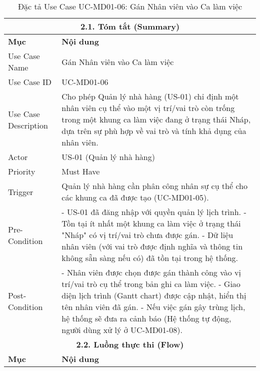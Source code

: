 \begin{longtable}{|m{4cm}|p{11cm}|}
\caption{Đặc tả Use Case UC-MD01-06: Gán Nhân viên vào Ca làm việc} \label{tab:uc_md01_06_revised} \\
\hline
\multicolumn{2}{|c|}{\textbf{2.1. Tóm tắt (Summary)}} \\
\hline
\textbf{Mục} & \textbf{Nội dung} \\
\hline
\endhead %
\hline
\endfoot %
\hline
\endlastfoot %
Use Case Name & Gán Nhân viên vào Ca làm việc \\
\hline
Use Case ID & UC-MD01-06 \\
\hline
Use Case Description & Cho phép Quản lý nhà hàng (US-01) chỉ định một nhân viên cụ thể vào một vị trí/vai trò còn trống trong một khung ca làm việc đang ở trạng thái Nháp, dựa trên sự phù hợp về vai trò và tính khả dụng của nhân viên. \\
\hline
Actor & US-01 (Quản lý nhà hàng) \\
\hline
Priority & Must Have \\
\hline
Trigger & Quản lý nhà hàng cần phân công nhân sự cụ thể cho các khung ca đã được tạo (UC-MD01-05). \\
\hline
Pre-Condition & - US-01 đã đăng nhập với quyền quản lý lịch trình. \newline - Tồn tại ít nhất một khung ca làm việc ở trạng thái "Nháp" có vị trí/vai trò chưa được gán. \newline - Dữ liệu nhân viên (với vai trò được định nghĩa và thông tin không sẵn sàng nếu có) đã tồn tại trong hệ thống. \\
\hline
Post-Condition & - Nhân viên được chọn được gán thành công vào vị trí/vai trò cụ thể trong bản ghi ca làm việc. \newline - Giao diện lịch trình (Gantt chart) được cập nhật, hiển thị tên nhân viên đã gán. \newline - Nếu việc gán gây trùng lịch, hệ thống sẽ đưa ra cảnh báo (Hệ thống tự động, người dùng xử lý ở UC-MD01-08). \\
\hline
\multicolumn{2}{|c|}{\textbf{2.2. Luồng thực thi (Flow)}} \\
\hline
\textbf{Mục} & \textbf{Nội dung} \\
\hline

\end{longtable}
